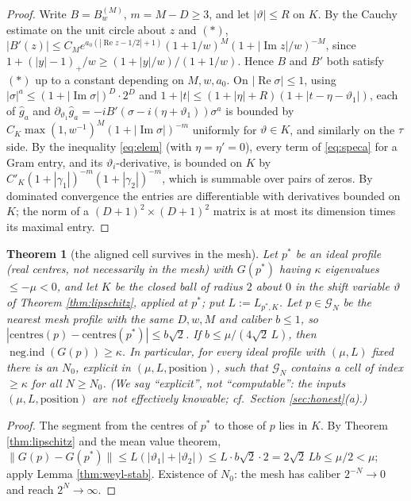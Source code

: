 \documentclass[11pt,reqno]{amsart}
\newtheorem{theorem}{Theorem}[section]
\theoremstyle{definition}
\newcommand{\negind}{\operatorname{neg.ind}}
\begin{document}
\begin{proof}
Write \(B=B^{(M)}_w\), \(m=M-D\geq3\), and let \(|\vartheta|\leq R\) on \(K\).
By the Cauchy estimate on the unit circle about \(z\) and \((\ast)\),
\(|B'(z)|\leq C_Me^{a_0(|\operatorname{Re}z-1/2|+1)}(1+1/w)^M
(1+|\operatorname{Im}z|/w)^{-M}\), since
\(1+(|y|-1)_+/w\geq(1+|y|/w)/(1+1/w)\). Hence \(B\) and \(B'\) both satisfy
\((\ast)\) up to a constant depending on \(M,w,a_0\). On
\(|\operatorname{Re}\sigma|\leq1\), using \(|\sigma|^a\leq(1+|\operatorname{Im}
\sigma|)^D\cdot2^D\) and \(1+|t|\leq(1+|\eta|+R)(1+|t-\eta-\vartheta_1|)\),
each of \(\hat g_a\) and \(\partial_{\vartheta_1}\hat g_a=-iB'(\sigma-i(\eta+
\vartheta_1))\sigma^a\) is bounded by
\(C_K\max(1,w^{-1})^M(1+|\operatorname{Im}\sigma|)^{-m}\) uniformly for
\(\vartheta\in K\), and similarly on the \(\tau\) side. By the inequality
\eqref{eq:elem} (with \(\eta=\eta'=0\)), every term of \eqref{eq:speca} for a
Gram entry, and its \(\vartheta_i\)-derivative, is bounded on \(K\) by
\(C'_K(1+|\gamma_1|)^{-m}(1+|\gamma_2|)^{-m}\), which is summable over pairs of
zeros. By dominated convergence the entries are differentiable with derivatives
bounded on \(K\); the norm of a \((D+1)^2\times(D+1)^2\) matrix is at most its
dimension times its maximal entry.
\end{proof}

\begin{theorem}[the aligned cell survives in the mesh]\label{thm:mesh}
Let \(p^*\) be an ideal profile (real centres, not necessarily in the mesh) with
\(G(p^*)\) having \(\kappa\) eigenvalues \(\leq-\mu<0\), and let \(K\) be the
closed ball of radius \(2\) about \(0\) in the shift variable \(\vartheta\) of
Theorem \ref{thm:lipschitz}, applied at \(p^*\); put \(L:=L_{p^*,K}\). Let
\(p\in\mathcal G_N\) be the nearest mesh profile with the same \(D,w,M\) and
caliber \(b\leq1\), so \(|\mathrm{centres}(p)-\mathrm{centres}(p^*)|\leq
b\sqrt2\). If \(b\leq\mu/(4\sqrt2\,L)\), then \(\negind(G(p))\geq\kappa\).
In particular, for every ideal profile with \((\mu,L)\) fixed there is an
\(N_0\), explicit in \((\mu,L,\mathrm{position})\), such that \(\mathcal G_N\)
contains a cell of index \(\geq\kappa\) for all \(N\geq N_0\). \textup{(}We say
``explicit'', not ``computable'': the inputs \((\mu,L,\mathrm{position})\) are
not effectively knowable; cf.\ Section \ref{sec:honest}\textup{(a)}.\textup{)}
\end{theorem}

\begin{proof}
The segment from the centres of \(p^*\) to those of \(p\) lies in \(K\). By
Theorem \ref{thm:lipschitz} and the mean value theorem,
\(\|G(p)-G(p^*)\|\leq L(|\vartheta_1|+|\vartheta_2|)\leq L\cdot b\sqrt2\cdot2
=2\sqrt2\,Lb\leq\mu/2<\mu\); apply Lemma \ref{thm:weyl-stab}. Existence of
\(N_0\): the mesh has caliber \(2^{-N}\to0\) and reach \(2^N\to\infty\).
\end{proof}
\end{document}
